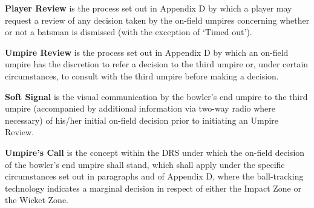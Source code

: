 \documentclass[12pt]{article}
\begin{document}
\vspace{\baselineskip}
\begin{adjustwidth}{0.4in}{0.06in}
{\fontsize{9pt}{10.8pt} \tabto{0.39in} \textbf{Player Review }is the process set out in Appendix D by which a player may request a review of any decision\textbf{ }taken by the on-field umpires concerning whether or not a batsman is dismissed (with the exception of ‘Timed out’).\par}\par

\end{adjustwidth}


\vspace{\baselineskip}
\begin{adjustwidth}{0.4in}{0.07in}
{\fontsize{9pt}{10.8pt} \tabto{0.39in} \textbf{Umpire Review }is the process set out in Appendix D by which an on-field umpire has the discretion to refer a\textbf{ }decision to the third umpire or, under certain circumstances, to consult with the third umpire before making a decision.\par}\par

\end{adjustwidth}


\vspace{\baselineskip}
\begin{adjustwidth}{0.4in}{0.17in}
{\fontsize{9pt}{10.8pt} \tabto{0.39in} \textbf{Soft Signal }is the visual communication by the bowler’s end umpire to the third umpire (accompanied by\textbf{ }additional information via two-way radio where necessary) of his/her initial on-field decision prior to initiating an Umpire Review.\par}\par

\end{adjustwidth}


\vspace{\baselineskip}
\begin{adjustwidth}{0.4in}{0.17in}
{\fontsize{9pt}{10.8pt} \tabto{0.39in} \textbf{Umpire’s Call }is the concept within the DRS under which the on-field decision of the bowler’s end umpire\textbf{ }shall stand, which shall apply under the specific circumstances set out in paragraphs and of Appendix D, where the ball-tracking technology indicates a marginal decision in respect of either the Impact Zone or the Wicket Zone.\par}\par

\end{adjustwidth}
\end{document}

